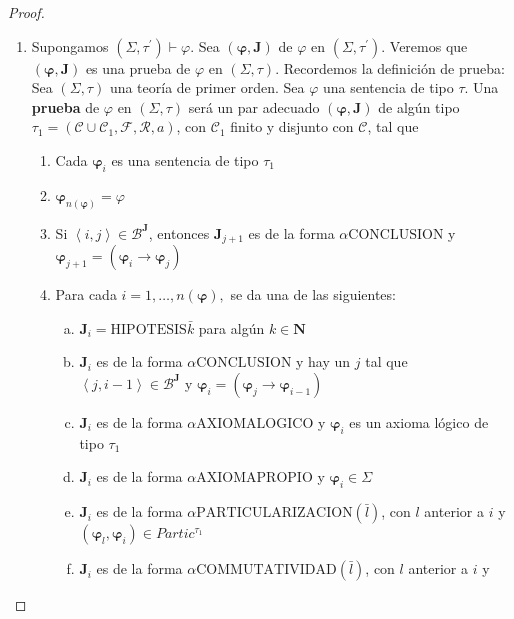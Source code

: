 \begin{proof}
\begin{enumerate}[(1)]
      \item Supongamos $(\Sigma, \tau^{\prime}) \vdash \varphi$. Sea $(\pmb{\varphi}, \mathbf{J})$ de $\varphi$ en
        $(\Sigma, \tau^{\prime})$. Veremos que $(\pmb{\varphi}, \mathbf{J})$ es una prueba de $\varphi$ en $(\Sigma,
        \tau)$. Recordemos la definición de prueba:
        \PN Sea $(\Sigma, \tau)$ una teoría de primer orden. Sea $\varphi$ una sentencia de tipo $\tau$. Una
        \textbf{prueba} de $\varphi$ en $(\Sigma, \tau)$ será un par adecuado $(\mathbf{\varphi}, \mathbf{J})$ de algún
        tipo $\tau_{1} = (\mathcal{C} \cup \mathcal{C}_{1}, \mathcal{F}, \mathcal{R}, a)$, con $\mathcal{C}_{1}$ finito
        y disjunto con $\mathcal{C}$, tal que
        \begin{enumerate}[(1)]
          \item Cada $\mathbf{\varphi}_{i}$ es una sentencia de tipo $\tau_{1}$
          \item $\mathbf{\varphi}_{n(\mathbf{\varphi})} = \varphi$
          \item Si $\left\langle i, j \right\rangle \in \mathcal{B}^{\mathbf{J}}$, entonces $\mathbf{J}_{j+1}$ es de la
            forma $\alpha \mathrm{CONCLUSION}$ y $\mathbf{\varphi}_{j+1} = (\mathbf{\varphi}_{i} \rightarrow
            \mathbf{\varphi}_{j})$
          \item Para cada $i = 1, \dotsc, n(\mathbf{\varphi}),$ se da una de las siguientes:
          \begin{enumerate}[(a)]
            \item $\mathbf{J}_{i} = \mathrm{HIPOTESIS}\bar{k}$ para algún $k \in \mathbf{N}$
            \item $\mathbf{J}_{i}$ es de la forma $\alpha \mathrm{CONCLUSION}$ y hay un $j$ tal que $\left\langle j, i-1
              \right\rangle \in \mathcal{B}^{\mathbf{J}}$ y $\mathbf{\varphi}_{i} = (\mathbf{\varphi}_{j} \rightarrow
              \mathbf{\varphi}_{i-1})$
            \item $\mathbf{J}_{i}$ es de la forma $\alpha \mathrm{AXIOMALOGICO}$ y $\mathbf{\varphi}_{i}$ es un axioma
              lógico de tipo $\tau_{1}$
            \item $\mathbf{J}_{i}$ es de la forma $\alpha \mathrm{AXIOMAPROPIO}$ y $\mathbf{\varphi}_{i} \in \Sigma$
            \item $\mathbf{J}_{i}$ es de la forma $\alpha \mathrm{PARTICULARIZACION} (\bar{l})$, con $l$ anterior a $i$
              y $(\mathbf{\varphi}_{l}, \mathbf{\varphi}_{i}) \in Partic^{\tau_{1}}$
            \item $\mathbf{J}_{i}$ es de la forma $\alpha \mathrm{COMMUTATIVIDAD}(\bar{l})$, con $l$ anterior a $i$ y

\end{enumerate}
\end{enumerate}
\end{enumerate}
\end{proof}
